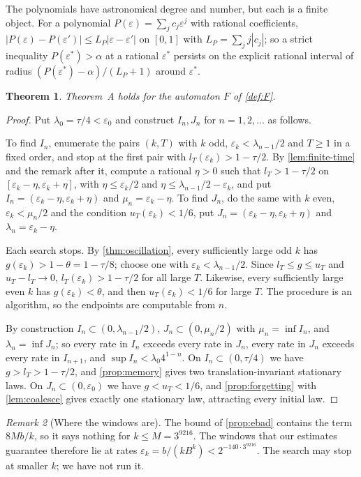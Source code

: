 \documentclass[11pt]{article}
\theoremstyle{plain}
\newtheorem{theorem}{Theorem}[section]
\theoremstyle{definition}
\theoremstyle{remark}
\newtheorem{remark}[theorem]{Remark}
\newcommand{\eps}{\varepsilon}
\begin{document}
The polynomials have astronomical degree and number, but each is a finite object. For a polynomial $P(\eps)=\sum_jc_j\eps^j$ with rational coefficients, $|P(\eps)-P(\eps')|\le L_P|\eps-\eps'|$ on $[0,1]$ with $L_P=\sum_jj|c_j|$; so a strict inequality $P(\eps^*)>\alpha$ at a rational $\eps^*$ persists on the explicit rational interval of radius $(P(\eps^*)-\alpha)/(L_P+1)$ around $\eps^*$.

\begin{theorem}\label{thm:mainA}
Theorem~A holds for the automaton $F$ of \cref{def:F}.
\end{theorem}

\begin{proof}
Put $\lambda_0=\tau/4<\eps_0$ and construct $I_n,J_n$ for $n=1,2,\dots$ as follows.

To find $I_n$, enumerate the pairs $(k,T)$ with $k$ odd, $\eps_k<\lambda_{n-1}/2$ and $T\ge1$ in a fixed order, and stop at the first pair with $l_T(\eps_k)>1-\tau/2$. By \cref{lem:finite-time} and the remark after it, compute a rational $\eta>0$ such that $l_T>1-\tau/2$ on $[\eps_k-\eta,\eps_k+\eta]$, with $\eta\le\eps_k/2$ and $\eta\le\lambda_{n-1}/2-\eps_k$, and put $I_n=(\eps_k-\eta,\eps_k+\eta)$ and $\mu_n=\eps_k-\eta$. To find $J_n$, do the same with $k$ even, $\eps_k<\mu_n/2$ and the condition $u_T(\eps_k)<1/6$, put $J_n=(\eps_k-\eta,\eps_k+\eta)$ and $\lambda_n=\eps_k-\eta$.

Each search stops. By \cref{thm:oscillation}, every sufficiently large odd $k$ has $g(\eps_k)>1-\theta=1-\tau/8$; choose one with $\eps_k<\lambda_{n-1}/2$. Since $l_T\le g\le u_T$ and $u_T-l_T\to0$, $l_T(\eps_k)>1-\tau/2$ for all large $T$. Likewise, every sufficiently large even $k$ has $g(\eps_k)<\theta$, and then $u_T(\eps_k)<1/6$ for large $T$. The procedure is an algorithm, so the endpoints are computable from $n$.

By construction $I_n\subset(0,\lambda_{n-1}/2)$, $J_n\subset(0,\mu_n/2)$ with $\mu_n=\inf I_n$, and $\lambda_n=\inf J_n$; so every rate in $I_n$ exceeds every rate in $J_n$, every rate in $J_n$ exceeds every rate in $I_{n+1}$, and $\sup I_n<\lambda_0 4^{1-n}$. On $I_n\subset(0,\tau/4)$ we have $g>l_T>1-\tau/2$, and \cref{prop:memory} gives two translation-invariant stationary laws. On $J_n\subset(0,\eps_0)$ we have $g<u_T<1/6$, and \cref{prop:forgetting} with \cref{lem:coalesce} gives exactly one stationary law, attracting every initial law.
\end{proof}

\begin{remark}[Where the windows are]\label{rem:scale}
The bound of \cref{prop:ebad} contains the term $8Mb/k$, so it says nothing for $k\le M=3^{9216}$. The windows that our estimates guarantee therefore lie at rates $\eps_k=b/(kB^k)<2^{-140\cdot3^{9216}}$. The search may stop at smaller $k$; we have not run it.
\end{remark}
\end{document}
